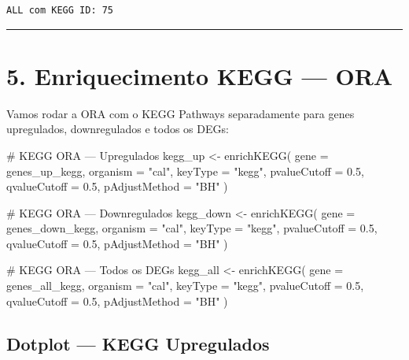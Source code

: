 \documentclass[
  letterpaper,
  DIV=11,
  numbers=noendperiod]{scrreprt}
\newenvironment{Shaded}{\begin{snugshade}}{\end{snugshade}}
\newcommand{\AttributeTok}[1]{\textcolor[rgb]{0.40,0.45,0.13}{#1}}
\newcommand{\CommentTok}[1]{\textcolor[rgb]{0.37,0.37,0.37}{#1}}
\newcommand{\FloatTok}[1]{\textcolor[rgb]{0.68,0.00,0.00}{#1}}
\newcommand{\FunctionTok}[1]{\textcolor[rgb]{0.28,0.35,0.67}{#1}}
\newcommand{\NormalTok}[1]{\textcolor[rgb]{0.00,0.23,0.31}{#1}}
\newcommand{\OtherTok}[1]{\textcolor[rgb]{0.00,0.23,0.31}{#1}}
\newcommand{\StringTok}[1]{\textcolor[rgb]{0.13,0.47,0.30}{#1}}
\begin{document}
\begin{verbatim}
ALL com KEGG ID: 75 
\end{verbatim}

\begin{center}\rule{0.5\linewidth}{0.5pt}\end{center}

\section{5. Enriquecimento KEGG --- ORA}\label{enriquecimento-kegg-ora}

Vamos rodar a ORA com o KEGG Pathways separadamente para genes
upregulados, downregulados e todos os DEGs:

\begin{Shaded}
\begin{Highlighting}[]
\CommentTok{\# KEGG ORA — Upregulados}
\NormalTok{kegg\_up }\OtherTok{\textless{}{-}} \FunctionTok{enrichKEGG}\NormalTok{(}
  \AttributeTok{gene =}\NormalTok{ genes\_up\_kegg, }\AttributeTok{organism =} \StringTok{"cal"}\NormalTok{, }\AttributeTok{keyType =} \StringTok{"kegg"}\NormalTok{,}
  \AttributeTok{pvalueCutoff =} \FloatTok{0.5}\NormalTok{, }\AttributeTok{qvalueCutoff =} \FloatTok{0.5}\NormalTok{, }\AttributeTok{pAdjustMethod =} \StringTok{"BH"}
\NormalTok{)}

\CommentTok{\# KEGG ORA — Downregulados}
\NormalTok{kegg\_down }\OtherTok{\textless{}{-}} \FunctionTok{enrichKEGG}\NormalTok{(}
  \AttributeTok{gene =}\NormalTok{ genes\_down\_kegg, }\AttributeTok{organism =} \StringTok{"cal"}\NormalTok{, }\AttributeTok{keyType =} \StringTok{"kegg"}\NormalTok{,}
  \AttributeTok{pvalueCutoff =} \FloatTok{0.5}\NormalTok{, }\AttributeTok{qvalueCutoff =} \FloatTok{0.5}\NormalTok{, }\AttributeTok{pAdjustMethod =} \StringTok{"BH"}
\NormalTok{)}

\CommentTok{\# KEGG ORA — Todos os DEGs}
\NormalTok{kegg\_all }\OtherTok{\textless{}{-}} \FunctionTok{enrichKEGG}\NormalTok{(}
  \AttributeTok{gene =}\NormalTok{ genes\_all\_kegg, }\AttributeTok{organism =} \StringTok{"cal"}\NormalTok{, }\AttributeTok{keyType =} \StringTok{"kegg"}\NormalTok{,}
  \AttributeTok{pvalueCutoff =} \FloatTok{0.5}\NormalTok{, }\AttributeTok{qvalueCutoff =} \FloatTok{0.5}\NormalTok{, }\AttributeTok{pAdjustMethod =} \StringTok{"BH"}
\NormalTok{)}
\end{Highlighting}
\end{Shaded}

\subsection{Dotplot --- KEGG
Upregulados}\label{dotplot-kegg-upregulados}
\end{document}
